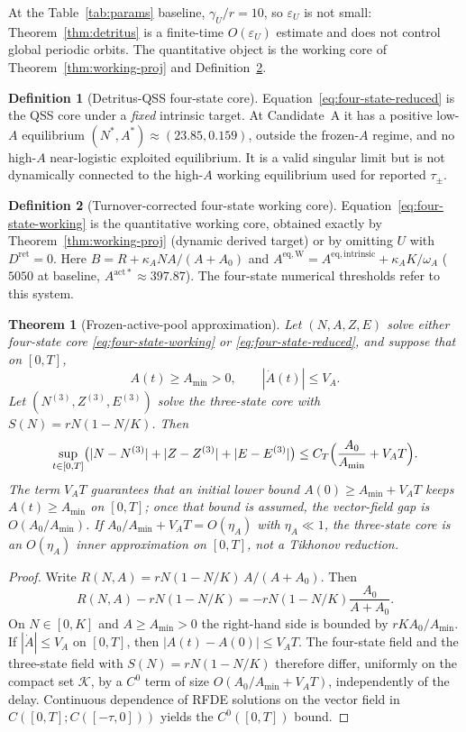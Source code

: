 \documentclass[11pt]{article}
\newtheorem{theorem}{Theorem}
\theoremstyle{definition}
\newtheorem{definition}{Definition}
\begin{document}
At the Table~\ref{tab:params} baseline, $\gamma_U/r=10$, so $\varepsilon_U$ is not small: Theorem~\ref{thm:detritus} is a finite-time $O(\varepsilon_U)$ estimate and does not control global periodic orbits. The quantitative object is the working core of Theorem~\ref{thm:working-proj} and Definition~\ref{def:working-four}.

\begin{definition}[Detritus-QSS four-state core]
\label{def:qss-four}
Equation~\eqref{eq:four-state-reduced} is the QSS core under a \emph{fixed} intrinsic target. At Candidate~A it has a positive low-$A$ equilibrium $(N^*,A^*)\approx(23.85,0.159)$, outside the frozen-$A$ regime, and no high-$A$ near-logistic exploited equilibrium. It is a valid singular limit but is not dynamically connected to the high-$A$ working equilibrium used for reported $\tau_\pm$.
\end{definition}

\begin{definition}[Turnover-corrected four-state working core]
\label{def:working-four}
Equation~\eqref{eq:four-state-working} is the quantitative working core, obtained exactly by Theorem~\ref{thm:working-proj} (dynamic derived target) or by omitting $U$ with $D^{\mathrm{ret}}=0$. Here $B=R+\kappa_A N A/(A+A_0)$ and $A^{\mathrm{eq,W}}=A^{\mathrm{eq,intrinsic}}+\kappa_A K/\omega_A$ ($5050$ at baseline, $A^{\mathrm{act}*}\approx 397.87$). The four-state numerical thresholds refer to this system.
\end{definition}

\begin{theorem}[Frozen-active-pool approximation]
\label{thm:frozenA}
Let $(N,A,Z,E)$ solve either four-state core \eqref{eq:four-state-working} or \eqref{eq:four-state-reduced}, and suppose that on $[0,T]$,
\[
A(t)\ge A_{\min}>0,\qquad |\dot A(t)|\le V_A.
\]
Let $(N^{(3)},Z^{(3)},E^{(3)})$ solve the three-state core with $S(N)=rN(1-N/K)$. Then
\[
\sup_{t\in[0,T]}\bigl(|N-N^{(3)}|+|Z-Z^{(3)}|+|E-E^{(3)}|\bigr)
\le C_T\Bigl(\frac{A_0}{A_{\min}}+V_A T\Bigr).
\]
The term $V_A T$ guarantees that an initial lower bound $A(0)\ge A_{\min}+V_A T$ keeps $A(t)\ge A_{\min}$ on $[0,T]$; once that bound is assumed, the vector-field gap is $O(A_0/A_{\min})$. If $A_0/A_{\min}+V_A T=O(\eta_A)$ with $\eta_A\ll 1$, the three-state core is an $O(\eta_A)$ inner approximation on $[0,T]$, not a Tikhonov reduction.
\end{theorem}

\begin{proof}
Write $R(N,A)=rN(1-N/K)\,A/(A+A_0)$. Then
\[
R(N,A)-rN(1-N/K)=-rN(1-N/K)\frac{A_0}{A+A_0}.
\]
On $N\in[0,K]$ and $A\ge A_{\min}>0$ the right-hand side is bounded by $rK A_0/A_{\min}$. If $|\dot A|\le V_A$ on $[0,T]$, then $|A(t)-A(0)|\le V_A T$. The four-state field and the three-state field with $S(N)=rN(1-N/K)$ therefore differ, uniformly on the compact set $\mathcal K$, by a $C^0$ term of size $O(A_0/A_{\min}+V_A T)$, independently of the delay. Continuous dependence of RFDE solutions on the vector field in $C([0,T];C([-\tau,0]))$ \cite[Ch.~2]{hale1993} yields the $C^0([0,T])$ bound.
\end{proof}
\end{document}

